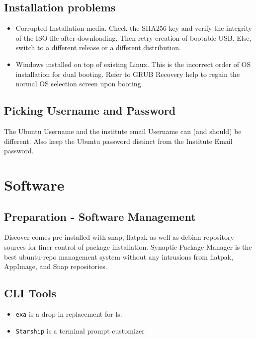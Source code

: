 \documentclass[8pt,a4paper]{article}
\begin{document}
\subsection{Installation problems}

\begin{itemize}
	\item Corrupted Installation media. Check the SHA256 key and verify the integrity of the ISO file after downloading.
	Then retry creation of bootable USB. Else, switch to a different release or a different distribution.
	\item Windows installed on top of existing Linux.
	This is the incorrect order of OS installation for dual booting.
	Refer to GRUB Recovery help to regain the normal OS selection screen upon booting.
\end{itemize}

\subsection{Picking Username and Password}
The Ubuntu Username and the institute email Username can (and should) be different.
Also keep the Ubuntu password distinct from the Institute Email password.

\newpage

\section{Software}
\subsection{Preparation - Software Management}

Discover comes pre-installed with snap, flatpak as well as debian repository sources 
for finer control of package installation.
Synaptic Package Manager is the best ubuntu-repo management system without any intrusions from 
flatpak, AppImage, and Snap repositories.

\subsection{CLI Tools}

\begin{itemize}
	\item \texttt{exa} is a drop-in replacement for ls.
	\item \texttt{Starship} is a terminal prompt customizer
\end{itemize}
\end{document}
